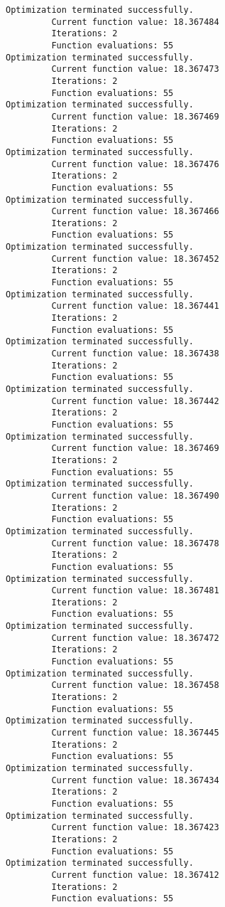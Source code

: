 \documentclass[11pt]{article}
\begin{document}
\begin{Verbatim}[commandchars=\\\{\}]
Optimization terminated successfully.
         Current function value: 18.367484
         Iterations: 2
         Function evaluations: 55
Optimization terminated successfully.
         Current function value: 18.367473
         Iterations: 2
         Function evaluations: 55
Optimization terminated successfully.
         Current function value: 18.367469
         Iterations: 2
         Function evaluations: 55
Optimization terminated successfully.
         Current function value: 18.367476
         Iterations: 2
         Function evaluations: 55
Optimization terminated successfully.
         Current function value: 18.367466
         Iterations: 2
         Function evaluations: 55
Optimization terminated successfully.
         Current function value: 18.367452
         Iterations: 2
         Function evaluations: 55
Optimization terminated successfully.
         Current function value: 18.367441
         Iterations: 2
         Function evaluations: 55
Optimization terminated successfully.
         Current function value: 18.367438
         Iterations: 2
         Function evaluations: 55
Optimization terminated successfully.
         Current function value: 18.367442
         Iterations: 2
         Function evaluations: 55
Optimization terminated successfully.
         Current function value: 18.367469
         Iterations: 2
         Function evaluations: 55
Optimization terminated successfully.
         Current function value: 18.367490
         Iterations: 2
         Function evaluations: 55
Optimization terminated successfully.
         Current function value: 18.367478
         Iterations: 2
         Function evaluations: 55
Optimization terminated successfully.
         Current function value: 18.367481
         Iterations: 2
         Function evaluations: 55
Optimization terminated successfully.
         Current function value: 18.367472
         Iterations: 2
         Function evaluations: 55
Optimization terminated successfully.
         Current function value: 18.367458
         Iterations: 2
         Function evaluations: 55
Optimization terminated successfully.
         Current function value: 18.367445
         Iterations: 2
         Function evaluations: 55
Optimization terminated successfully.
         Current function value: 18.367434
         Iterations: 2
         Function evaluations: 55
Optimization terminated successfully.
         Current function value: 18.367423
         Iterations: 2
         Function evaluations: 55
Optimization terminated successfully.
         Current function value: 18.367412
         Iterations: 2
         Function evaluations: 55

\end{Verbatim}
\end{document}
